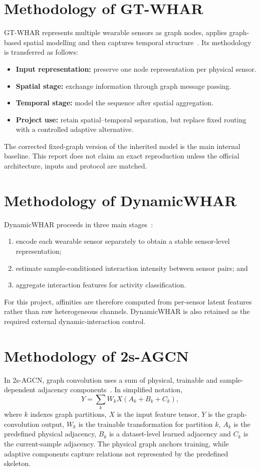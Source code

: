 \documentclass[12pt,a4paper,twoside,openright]{report}
\begin{document}
\section{Methodology of GT-WHAR}
GT-WHAR represents multiple wearable sensors as graph nodes, applies graph-based spatial modelling and then captures temporal structure~\cite{gtwhar}. Its methodology is transferred as follows:
\begin{itemize}
\item \textbf{Input representation:} preserve one node representation per physical sensor.
\item \textbf{Spatial stage:} exchange information through graph message passing.
\item \textbf{Temporal stage:} model the sequence after spatial aggregation.
\item \textbf{Project use:} retain spatial--temporal separation, but replace fixed routing with a controlled adaptive alternative.
\end{itemize}

The corrected fixed-graph version of the inherited model is the main internal baseline. This report does not claim an exact reproduction unless the official architecture, inputs and protocol are matched.

\section{Methodology of DynamicWHAR}
DynamicWHAR proceeds in three main stages~\cite{dynamicwhar}:
\begin{enumerate}
\item encode each wearable sensor separately to obtain a stable sensor-level representation;
\item estimate sample-conditioned interaction intensity between sensor pairs; and
\item aggregate interaction features for activity classification.
\end{enumerate}
For this project, affinities are therefore computed from per-sensor latent features rather than raw heterogeneous channels. DynamicWHAR is also retained as the required external dynamic-interaction control.

\section{Methodology of 2s-AGCN}
In 2s-AGCN, graph convolution uses a sum of physical, trainable and sample-dependent adjacency components~\cite{agcn}. In simplified notation,
\[
Y=\sum_k W_kX(A_k+B_k+C_k),
\]
where $k$ indexes graph partitions, $X$ is the input feature tensor, $Y$ is the graph-convolution output, $W_k$ is the trainable transformation for partition $k$, $A_k$ is the predefined physical adjacency, $B_k$ is a dataset-level learned adjacency and $C_k$ is the current-sample adjacency. The physical graph anchors training, while adaptive components capture relations not represented by the predefined skeleton.
\end{document}
